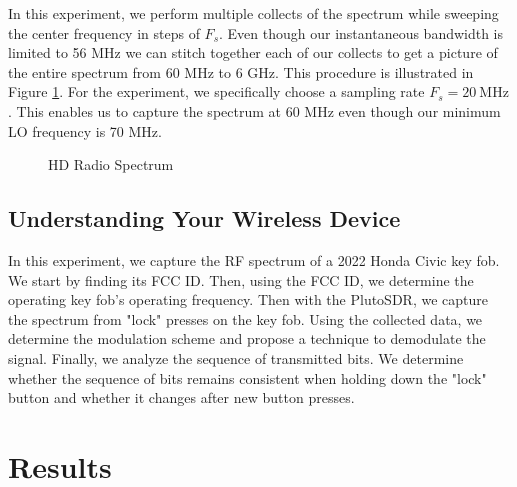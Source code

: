 \documentclass{article}
\begin{document}
In this experiment, we perform multiple collects of the spectrum while sweeping the center frequency in steps of $F_s$. Even though our instantaneous bandwidth is limited to 56 MHz we can stitch together each of our collects to get a picture of the entire spectrum from 60 MHz to 6 GHz. This procedure is illustrated in Figure \ref{fig::sweeping_the_spectrum}. For the experiment, we specifically choose a sampling rate $F_s = 20\ \text{MHz}$. This enables us to capture the spectrum at 60 MHz even though our minimum LO frequency is 70 MHz. 

\begin{figure}[H]
	\centerline{}
	\caption{HD Radio Spectrum}
	\label{fig::sweeping_the_spectrum}
\end{figure}

\subsection{Understanding Your Wireless Device}

In this experiment, we capture the RF spectrum of a 2022 Honda Civic key fob. 
We start by finding its FCC ID. Then, using the FCC ID, we determine the operating key fob's operating frequency. Then with the PlutoSDR, we capture the spectrum from "lock" presses on the key fob. Using the collected data, we determine the modulation scheme and propose a technique to demodulate the signal. Finally, we analyze the sequence of transmitted bits. We determine whether the sequence of bits remains consistent when holding down the "lock" button and whether it changes after new button presses.

\section{Results}

\end{document}
